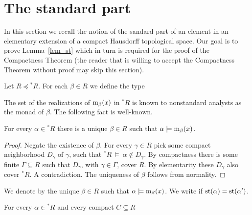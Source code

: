 \documentclass[11pt,oneside]{amsart}
\renewcommand*{\emph}[1]{%
   \smash{\tikz[baseline]\node[rectangle, fill=teal!25, rounded corners, inner xsep=0.5ex, inner ysep=0.2ex, anchor=base, minimum height = 2.7ex]{#1};}}
\begin{document}
\section{The standard part}\label{standard_part}

In this section we recall the notion of the sandard part of an element in an elementary extension of a compact Hausdorff topological space.
Our goal is to prove Lemma~\ref{lem_st} which in turn is required for the proof of the Compactness Theorem (the reader that is willing to accept the Compactness Theorem without proof may skip this section).


Let $R\preceq{}^*\!R$.
For each $\beta\in R$ we define the type


The set of the realizations of ${\rm m}_\beta(x)$ in ${}^*\!R$ is known to nonstandard analysts as the monad of $\beta$. 
The following fact is well-known.

\begin{fact}\label{fact_uniqueness_st}
  For every $\alpha\in{}^*\!R$ there is a unique $\beta\in R$ such that $\alpha\models{\rm m}_\beta(x)$.
\end{fact}

\begin{proof}
  Negate the existence of $\beta$.
  For every $\gamma\in R$ pick some compact neighborhood $D_\gamma$ of $\gamma$, such that ${}^*\!R\ \models\ \alpha\notin D_\gamma$.
  By compactness there is some finite $\Gamma\subseteq R$ such that $D_\gamma$, with $\gamma\in\Gamma$, cover $R$.
  By elementarity these $D_{\gamma}$ also cover ${}^*\!R$.
  A contradiction.
  The uniqueness of $\beta$ follows from normality.
\end{proof}

We denote by \emph{${\rm st}(\alpha)$\/} the unique $\beta\in R$ such that $\alpha\models{\rm m}_\beta(x)$.
We write \emph{$\alpha\approx\alpha'$\/} if ${\rm st}(\alpha)={\rm st}(\alpha')$.

\begin{fact}\label{fact_st1}
  For every $\alpha\in{}^*\! R$ and every compact $C\subseteq R$

\end{fact}
\end{document}

